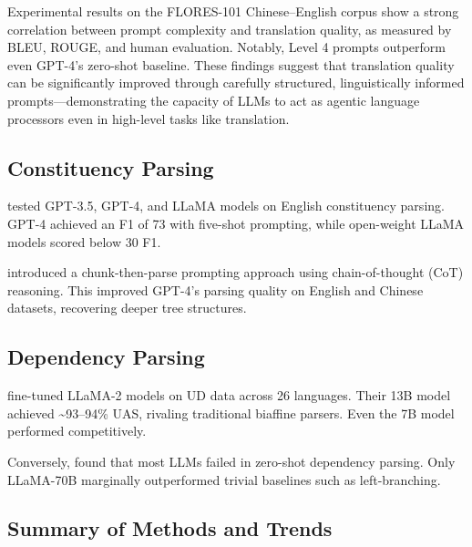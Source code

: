 Experimental results on the FLORES-101 Chinese--English corpus show a strong correlation between prompt complexity and translation quality, as measured by BLEU, ROUGE, and human evaluation. Notably, Level 4 prompts outperform even GPT-4's zero-shot baseline. These findings suggest that translation quality can be significantly improved through carefully structured, linguistically informed prompts—demonstrating the capacity of LLMs to act as agentic language processors even in high-level tasks like translation.

\subsection{Constituency Parsing}

\citet{bai2023llmconst} tested GPT-3.5, GPT-4, and LLaMA models on English constituency parsing. GPT-4 achieved an F1 of 73 with five-shot prompting, while open-weight LLaMA models scored below 30 F1.

\citet{tian2024chunkprompt} introduced a chunk-then-parse prompting approach using chain-of-thought (CoT) reasoning. This improved GPT-4's parsing quality on English and Chinese datasets, recovering deeper tree structures.

\subsection{Dependency Parsing}

\citet{hromei2024udllama} fine-tuned LLaMA-2 models on UD data across 26 languages. Their 13B model achieved \textasciitilde93--94\% UAS, rivaling traditional biaffine parsers. Even the 7B model performed competitively.

Conversely, \citet{dubey2025zeroshotdep} found that most LLMs failed in zero-shot dependency parsing. Only LLaMA-70B marginally outperformed trivial baselines such as left-branching.

\subsection{Summary of Methods and Trends}


